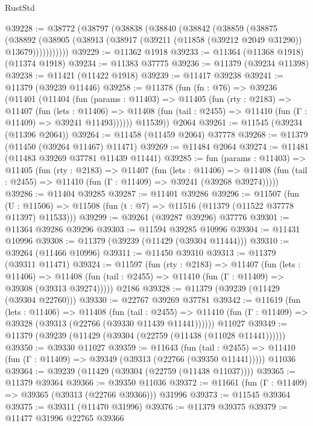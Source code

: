 \begin{lexlean}{RustStd}
\begin{coremodule}
@39228 := @38772
    (@38797
      (@38838
        (@38840
          (@38842
            (@38859
              (@38875
                (@38892
                  (@38905 (@38913 (@38917 (@39211 (@11858 (@39212 @2049 @31290)) @13679)))))))))))
@39229 := @11362 @1918
@39233 := @11364 (@11368 @1918) (@11374 @1918)
@39234 := @11383 @37775
@39236 := @11379 (@39234 @11398)
@39238 := @11421 (@11422 @1918)
@39239 := @11417 @39238
@39241 := @11379 (@39239 @11446)
@39258 := @11378
    (fun (fn : @76) =>
    @39236
      (@11401
        (@11404
          (fun (params : @11403) =>
          @11405
            (fun (rty : @2183) =>
            @11407
              (fun (lets : @11406) =>
              @11408 (fun (tail : @2455) => @11410 (fun (Γ : @11409) => @39241 @11493))))))
        @11539))
    @2064
@39261 := @11545 (@39234 (@11396 @2064))
@39264 := @11458 (@11459 @2064) @37778
@39268 := @11379 (@11450 (@39264 @11467) @11471)
@39269 := @11484 @2064
@39274 := @11481 (@11483 @39269 @37781 @11439 @11441)
@39285 := fun (params : @11403) =>
  @11405
    (fun (rty : @2183) =>
    @11407
      (fun (lets : @11406) =>
      @11408 (fun (tail : @2455) => @11410 (fun (Γ : @11409) => @39241 (@39268 @39274)))))
@39286 := @11404 @39285
@39287 := @11401 @39286
@39296 := @11507
    (fun (U : @11506) => @11508 (fun (t : @7) => @11516 (@11379 (@11522 @37778 @11397) @11533)))
@39299 := @39261 (@39287 @39296) @37776
@39301 := @11364 @39286 @39296
@39303 := @11594 @39285 @10996
@39304 := @11431 @10996
@39308 := @11379 (@39239 (@11429 (@39304 @11444)))
@39310 := @39264 (@11466 @10996)
@39311 := @11450 @39310
@39313 := @11379 (@39311 @11471)
@39324 := @11597
    (fun (rty : @2183) =>
    @11407
      (fun (lets : @11406) =>
      @11408 (fun (tail : @2455) => @11410 (fun (Γ : @11409) => @39308 (@39313 @39274)))))
    @2186
@39328 := @11379 (@39239 (@11429 (@39304 @22760)))
@39330 := @22767 @39269 @37781
@39342 := @11619
    (fun (lets : @11406) =>
    @11408
      (fun (tail : @2455) =>
      @11410 (fun (Γ : @11409) => @39328 (@39313 (@22766 (@39330 @11439 @11441))))))
    @11027
@39349 := @11379 (@39239 (@11429 (@39304 (@22759 (@11438 (@11028 @11441))))))
@39350 := @39330 @11027
@39359 := @11643
    (fun (tail : @2455) => @11410 (fun (Γ : @11409) => @39349 (@39313 (@22766 (@39350 @11441)))))
    @11036
@39364 := @39239 (@11429 (@39304 (@22759 (@11438 @11037))))
@39365 := @11379 @39364
@39366 := @39350 @11036
@39372 := @11661 (fun (Γ : @11409) => @39365 (@39313 (@22766 @39366))) @31996
@39373 := @11545 @39364
@39375 := @39311 (@11470 @31996)
@39376 := @11379 @39375
@39379 := @11477 @31996 @22765 @39366

\end{coremodule}
\end{lexlean}
